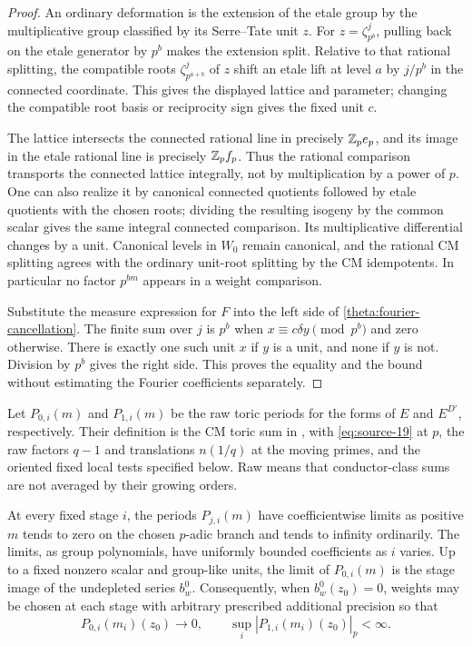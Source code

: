 \begin{proof}
An ordinary deformation is the extension of the etale group by the
multiplicative group classified by its Serre--Tate unit $z$.
For $z=\zeta_{p^b}^j$, pulling back on the etale generator by $p^b$
makes the extension split.  Relative to that rational splitting,
the compatible roots $\zeta_{p^{a+b}}^j$ of $z$ shift an etale
lift at level $a$ by $j/p^b$ in the connected coordinate.  This
gives the displayed lattice and parameter; changing the compatible
root basis or reciprocity sign gives the fixed unit $c$.

The lattice intersects the connected rational line in precisely
$\mathbb Z_pe_p$, and its image in the etale rational line is precisely
$\mathbb Z_pf_p$.  Thus the rational comparison transports the connected
lattice integrally, not by multiplication by a power of $p$.
One can also realize it by canonical connected quotients followed
by etale quotients with the chosen roots; dividing the resulting
isogeny by the common scalar gives the same integral connected
comparison.  Its multiplicative differential changes by a unit.
Canonical levels in $W_0$ remain canonical, and the rational CM
splitting agrees with the ordinary unit-root splitting by the CM
idempotents.  In particular no factor $p^{bm}$ appears in a weight
comparison.

Substitute the measure expression for $F$ into the left side of
\eqref{theta:fourier-cancellation}.  The finite sum over $j$ is
$p^b$ when $x\equiv c\delta y\pmod{p^b}$ and zero otherwise.
There is exactly one such unit $x$ if $y$ is a unit, and none if
$y$ is not.  Division by $p^b$ gives the right side.  This proves
the equality and the bound without estimating the Fourier
coefficients separately.
\end{proof}

Let $P_{0,i}(m)$ and $P_{1,i}(m)$ be the raw toric periods for the
forms of $E$ and $E^{D'}$, respectively.  Their definition is the
CM toric sum in \cite[Section 5]{C}, with
\eqref{eq:source-19} at $p$, the raw factors $q-1$ and translations
$n(1/q)$ at the moving primes, and the oriented fixed local tests
specified below.  Raw means that conductor-class sums are not
averaged by their growing orders.

\begin{proposition}\label{theta:toric-limit}
At every fixed stage $i$, the periods $P_{j,i}(m)$ have coefficientwise
limits as positive $m$ tends to zero on the chosen $p$-adic branch
and tends to infinity ordinarily.  The limits, as group polynomials,
have uniformly bounded coefficients as $i$ varies.  Up to a fixed
nonzero scalar and group-like units, the limit of $P_{0,i}(m)$ is
the stage image of the undepleted series $b_w^0$.
Consequently, when $b_w^0(z_0)=0$, weights may be chosen at each
stage with arbitrary prescribed additional precision so that
\[
 P_{0,i}(m_i)(z_0)\longrightarrow0,
 \qquad \sup_i|P_{1,i}(m_i)(z_0)|_p<\infty.
\]
\end{proposition}

